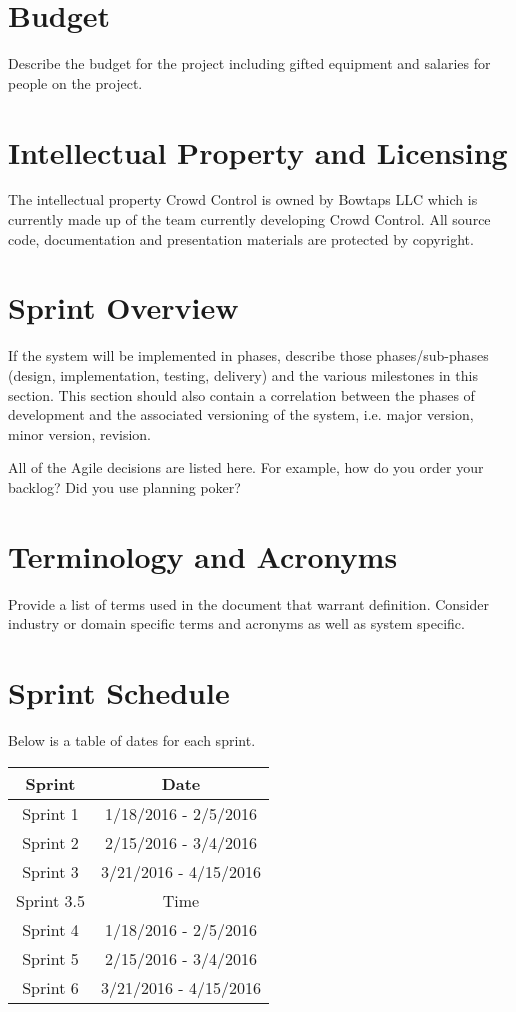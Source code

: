 \section{Budget}
Describe the budget for the project including gifted equipment and salaries for 
people on the project.

\section{Intellectual Property and Licensing}
The intellectual property Crowd Control is owned by Bowtaps LLC which is currently made up of the team currently developing Crowd Control.  All source code, documentation and presentation materials are protected by copyright.

\section{Sprint  Overview}
If the system will be implemented in phases, describe those phases/sub-phases (design, 
implementation, testing, delivery) and the various milestones in this section. 
 This section should also contain a correlation between the phases of development 
and the associated versioning of the system, i.e. major version, minor version, 
revision. 

All of the Agile decisions are listed here.  For example, how do you order your backlog?   
Did you use planning poker?   

\section{Terminology and Acronyms}
Provide a list of terms used in the document that warrant definition.  Consider 
industry or domain specific terms and acronyms as well as system specific. 

\section{Sprint Schedule}
Below is a table of dates for each sprint.\\
\begin{center}
	\begin{tabular}{|c|c|}
	\hline
	Sprint & Date\\
	\hline
	Sprint 1 & 1/18/2016 - 2/5/2016\\
	\hline
	Sprint 2 & 2/15/2016 - 3/4/2016\\
	\hline
	Sprint 3 & 3/21/2016 - 4/15/2016\\
	\hline
	Sprint 3.5 & Time\\
	\hline
	Sprint 4 & 1/18/2016 - 2/5/2016\\
	\hline
	Sprint 5 & 2/15/2016 - 3/4/2016\\
	\hline
	Sprint 6 & 3/21/2016 - 4/15/2016\\
	\hline
	\end{tabular}
\end{center}


